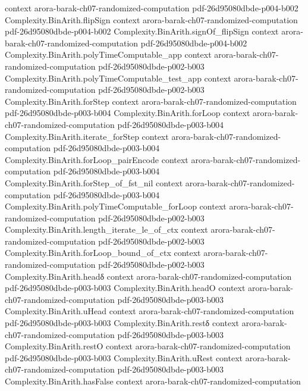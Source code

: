 \begin{theorem}
  {context}
  {arora-barak-ch07-randomized-computation}
  {pdf-26d95080dbde-p004-b002}
\proofstep
  {Complexity.BinArith.flipSign}
  {context}
  {arora-barak-ch07-randomized-computation}
  {pdf-26d95080dbde-p004-b002}
\proofstep
  {Complexity.BinArith.signOf_flipSign}
  {context}
  {arora-barak-ch07-randomized-computation}
  {pdf-26d95080dbde-p004-b002}
\proofstep
  {Complexity.BinArith.polyTimeComputable_app}
  {context}
  {arora-barak-ch07-randomized-computation}
  {pdf-26d95080dbde-p002-b003}
\proofstep
  {Complexity.BinArith.polyTimeComputable_test_app}
  {context}
  {arora-barak-ch07-randomized-computation}
  {pdf-26d95080dbde-p002-b003}
\proofstep
  {Complexity.BinArith.forStep}
  {context}
  {arora-barak-ch07-randomized-computation}
  {pdf-26d95080dbde-p003-b004}
\proofstep
  {Complexity.BinArith.forLoop}
  {context}
  {arora-barak-ch07-randomized-computation}
  {pdf-26d95080dbde-p003-b004}
\proofstep
  {Complexity.BinArith.iterate_forStep}
  {context}
  {arora-barak-ch07-randomized-computation}
  {pdf-26d95080dbde-p003-b004}
\proofstep
  {Complexity.BinArith.forLoop_pairEncode}
  {context}
  {arora-barak-ch07-randomized-computation}
  {pdf-26d95080dbde-p003-b004}
\proofstep
  {Complexity.BinArith.forStep_of_fst_nil}
  {context}
  {arora-barak-ch07-randomized-computation}
  {pdf-26d95080dbde-p003-b004}
\proofstep
  {Complexity.BinArith.polyTimeComputable_forLoop}
  {context}
  {arora-barak-ch07-randomized-computation}
  {pdf-26d95080dbde-p002-b003}
\proofstep
  {Complexity.BinArith.length_iterate_le_of_ctx}
  {context}
  {arora-barak-ch07-randomized-computation}
  {pdf-26d95080dbde-p002-b003}
\proofstep
  {Complexity.BinArith.forLoop_bound_of_ctx}
  {context}
  {arora-barak-ch07-randomized-computation}
  {pdf-26d95080dbde-p002-b003}
\proofstep
  {Complexity.BinArith.headδ}
  {context}
  {arora-barak-ch07-randomized-computation}
  {pdf-26d95080dbde-p003-b003}
\proofstep
  {Complexity.BinArith.headO}
  {context}
  {arora-barak-ch07-randomized-computation}
  {pdf-26d95080dbde-p003-b003}
\proofstep
  {Complexity.BinArith.uHead}
  {context}
  {arora-barak-ch07-randomized-computation}
  {pdf-26d95080dbde-p003-b003}
\proofstep
  {Complexity.BinArith.restδ}
  {context}
  {arora-barak-ch07-randomized-computation}
  {pdf-26d95080dbde-p003-b003}
\proofstep
  {Complexity.BinArith.restO}
  {context}
  {arora-barak-ch07-randomized-computation}
  {pdf-26d95080dbde-p003-b003}
\proofstep
  {Complexity.BinArith.uRest}
  {context}
  {arora-barak-ch07-randomized-computation}
  {pdf-26d95080dbde-p003-b003}
\proofstep
  {Complexity.BinArith.hasFalse}
  {context}
  {arora-barak-ch07-randomized-computation}

\end{theorem}
